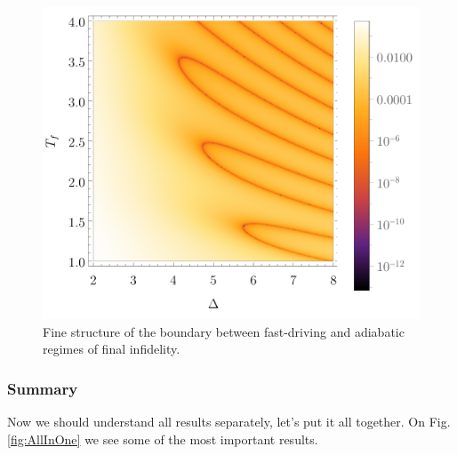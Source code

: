\begin{figure}[H]
    \centering 
    \includegraphics[scale=1.2]{../img/dens2Zoom.pdf}
    \caption{Fine structure of the boundary between fast-driving and adiabatic regimes of final infidelity.}
    \label{fig:dens2Zoom}
\end{figure}



\subsubsection{Summary}
Now we should understand all results separately, let's put it all together. On Fig. \ref{fig:AllInOne} we see some of the most important results.

